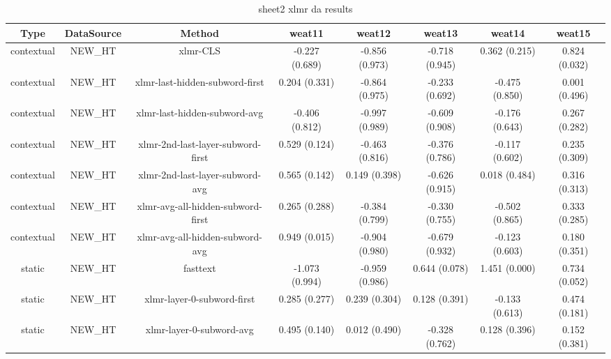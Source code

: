 \begin{sidewaystable}[htb]
    \centering
    \caption{sheet2 xlmr da results}
    \label{appendix_tab:sheet2_xlmr_da_results}
    \small
    \begin{tabular}{@{}cccccccc@{}}
        \toprule
        Type & DataSource & Method & weat11 & weat12 & weat13 & weat14 & weat15 \\
        \midrule
        contextual & NEW\_HT & xlmr-CLS & -0.227 (0.689) & -0.856 (0.973) & -0.718 (0.945) & 0.362 (0.215) & 0.824 (0.032) \\
        contextual & NEW\_HT & xlmr-last-hidden-subword-first & 0.204 (0.331) & -0.864 (0.975) & -0.233 (0.692) & -0.475 (0.850) & 0.001 (0.496) \\
        contextual & NEW\_HT & xlmr-last-hidden-subword-avg & -0.406 (0.812) & -0.997 (0.989) & -0.609 (0.908) & -0.176 (0.643) & 0.267 (0.282) \\
        contextual & NEW\_HT & xlmr-2nd-last-layer-subword-first & 0.529 (0.124) & -0.463 (0.816) & -0.376 (0.786) & -0.117 (0.602) & 0.235 (0.309) \\
        contextual & NEW\_HT & xlmr-2nd-last-layer-subword-avg & 0.565 (0.142) & 0.149 (0.398) & -0.626 (0.915) & 0.018 (0.484) & 0.316 (0.313) \\
        contextual & NEW\_HT & xlmr-avg-all-hidden-subword-first & 0.265 (0.288) & -0.384 (0.799) & -0.330 (0.755) & -0.502 (0.865) & 0.333 (0.285) \\
        contextual & NEW\_HT & xlmr-avg-all-hidden-subword-avg & 0.949 (0.015) & -0.904 (0.980) & -0.679 (0.932) & -0.123 (0.603) & 0.180 (0.351) \\
        static & NEW\_HT & fasttext & -1.073 (0.994) & -0.959 (0.986) & 0.644 (0.078) & 1.451 (0.000) & 0.734 (0.052) \\
        static & NEW\_HT & xlmr-layer-0-subword-first & 0.285 (0.277) & 0.239 (0.304) & 0.128 (0.391) & -0.133 (0.613) & 0.474 (0.181) \\
        static & NEW\_HT & xlmr-layer-0-subword-avg & 0.495 (0.140) & 0.012 (0.490) & -0.328 (0.762) & 0.128 (0.396) & 0.152 (0.381) \\
        \bottomrule
    \end{tabular}
\end{sidewaystable}